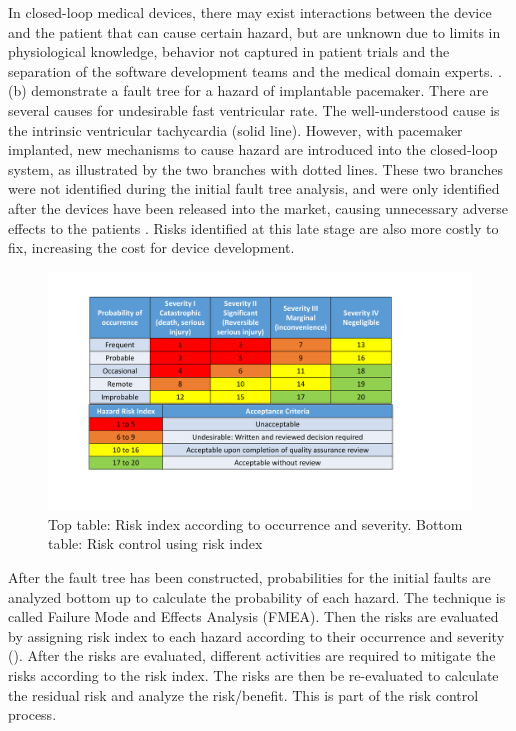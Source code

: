 In closed-loop medical devices, there may exist interactions between the device and the patient that can cause certain hazard, but are unknown due to limits in physiological knowledge, behavior not captured in patient trials and the separation of the software development teams and the medical domain experts. .(b) demonstrate a fault tree for a hazard of implantable pacemaker. There are several causes for undesirable fast ventricular rate. The well-understood cause is the intrinsic ventricular tachycardia (solid line). However, with pacemaker implanted, new mechanisms to cause hazard are introduced into the closed-loop system, as illustrated by the two branches with dotted lines. These two branches were not identified during the initial fault tree analysis, and were only identified after the devices have been released into the market, causing unnecessary adverse effects to the patients \cite{ELT}. Risks identified at this late stage are also more costly to fix, increasing the cost for device development. 


\begin{figure}[t]
		\centering
		\includegraphics[width=\textwidth]{figs/risk_analysis.pdf}
		\caption{Top table: Risk index according to occurrence and severity. Bottom table: Risk control using risk index}
		\label{fig:risk_ana}
\end{figure}

After the fault tree has been constructed, probabilities for the initial faults are analyzed bottom up to calculate the probability of each hazard. The technique is called Failure Mode and Effects Analysis (FMEA). Then the risks are evaluated by assigning risk index to each hazard according to their occurrence and severity (). After the risks are evaluated, different activities are required to mitigate the risks according to the risk index. The risks are then be re-evaluated to calculate the residual risk and analyze the risk/benefit. This is part of the risk control process. %

